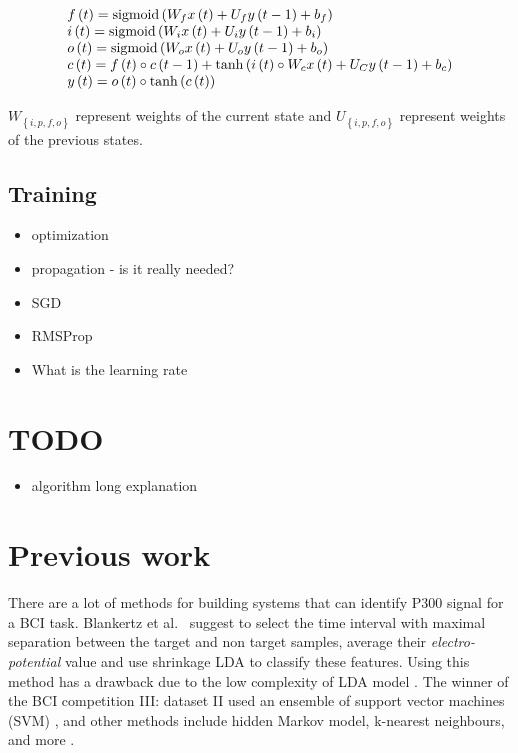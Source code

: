 \documentclass[
12pt, %
english, %
doublespacing, %
headsepline, %
]{MastersDoctoralThesis} %
\begin{document}
\[\begin{array}{l}
f\left( t \right) = {\rm{sigmoid}}\left( {{W_f}x\left( t \right) + {U_f}y\left( {t - 1} \right) + {b_f}} \right)\\
i\left( t \right) = {\rm{sigmoid}}\left( {{W_i}x\left( t \right) + {U_i}y\left( {t - 1} \right) + {b_i}} \right)\\
o\left( t \right) = {\rm{sigmoid}}\left( {{W_o}x\left( t \right) + {U_o}y\left( {t - 1} \right) + {b_o}} \right)\\
c\left( t \right) = f\left( t \right) \circ c\left( {t - 1} \right) + \tanh \left( {i\left( t \right) \circ {W_c}x\left( t \right) + {U_C}y\left( {t - 1} \right) + {b_c}} \right)\\
y\left( t \right) = o\left( t \right) \circ \tanh \left( {c\left( t \right)} \right)
\end{array}\]

${W_{\left\{ {i,p,f,o} \right\}}}$ represent weights of the current state and  ${U_{\left\{ {i,p,f,o} \right\}}}$ represent weights of the previous states. 



\subsection{Training}
\begin{itemize}
	\item optimization
	\item propagation - is it really needed?
	\item SGD
	\item RMSProp
	\item What is the learning rate
\end{itemize}
\textcolor{red}{}


\section{TODO}
\begin{itemize}
	\item algorithm long explanation
\end{itemize}


\section{Previous work}


There are a lot of methods for building systems that can identify P300 signal for a BCI task. Blankertz et al.~\cite{P300_Tutorial} suggest to select the time interval with maximal separation between the target and non target samples, average their \textit{electro-potential} value and use shrinkage LDA to classify these features. Using this method has a drawback due to the low complexity of LDA model \cite{cincotti2003comparison}. The winner of the BCI competition III: dataset II used an ensemble of support vector machines (SVM) \cite{P300SVMWinner}, and other methods include hidden Markov model, k-nearest neighbours, and more  \cite{cincotti2003comparison}.
\end{document}
